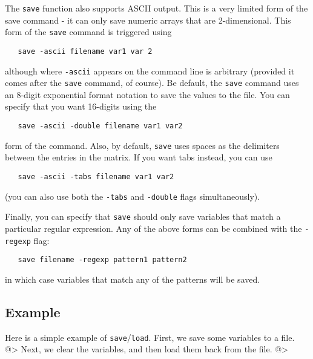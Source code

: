 The \verb|save| function also supports ASCII output.  This is a very limited
form of the save command - it can only save numeric arrays that are
2-dimensional.  This form of the \verb|save| command is triggered using
\begin{verbatim}
   save -ascii filename var1 var 2
\end{verbatim}
although where \verb|-ascii| appears on the command line is arbitrary (provided
it comes after the \verb|save| command, of course).  Be default, the \verb|save|
command uses an 8-digit exponential format notation to save the values to
the file.  You can specify that you want 16-digits using the
\begin{verbatim}
   save -ascii -double filename var1 var2
\end{verbatim}
form of the command.  Also, by default, \verb|save| uses spaces as the 
delimiters between the entries in the matrix.  If you want tabs instead,
you can use
\begin{verbatim}
   save -ascii -tabs filename var1 var2
\end{verbatim}
(you can also use both the \verb|-tabs| and \verb|-double| flags simultaneously).

Finally, you can specify that \verb|save| should only save variables that
match a particular regular expression.  Any of the above forms can be
combined with the \verb|-regexp| flag:
\begin{verbatim}
   save filename -regexp pattern1 pattern2
\end{verbatim}
in which case variables that match any of the patterns will be saved.
\subsection{Example}

Here is a simple example of \verb|save|/\verb|load|.  First, we save some 
variables to a file.
@>
Next, we clear the variables, and then load them back from the file.
@>
